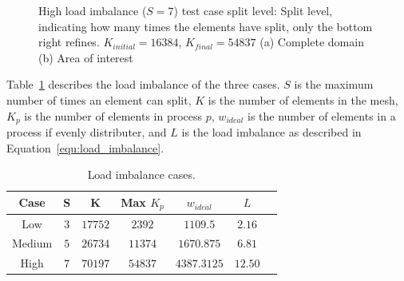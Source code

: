 \begin{figure}[H]
	\centering
	\hfill
	\caption{High load imbalance (\(S = 7\)) test case split level: Split level, indicating how many times the elements have split, only the bottom right refines. \(K_{initial} = 16384\), \(K_{final} = 54837\) (a) Complete domain (b) Area of interest}\label{fig:load_imbalance_case_high_s}
\end{figure}

Table~\ref{table:load_imbalance} describes the load imbalance of the three cases. \(S\) is the
maximum number of times an element can split, \(K\) is the number of elements in the mesh, \(K_p\)
is the number of elements in process \(p\), \(w_{ideal}\) is the number of elements in a process if
evenly distributer, and \(L\) is the load imbalance as described in
Equation~\ref{equ:load_imbalance}.

\begin{table}[H]
	\centering
	\begin{tabular}{ c c c c c c c }
		Case & S & K & Max \(K_p\) & \(w_{ideal}\) & \(L\) \\
		\midrule
		Low & \(3\) & \(17752\) & \(2392\) & \(1109.5\) & \(2.16\) \\
		Medium & \(5\) & \(26734\) & \(11374\) & \(1670.875\) & \(6.81\) \\
		High & \(7\) & \(70197\) & \(54837\) & \(4387.3125\) & \(12.50\) \\
	\end{tabular}
	\caption{Load imbalance cases.}\label{table:load_imbalance}
\end{table}

